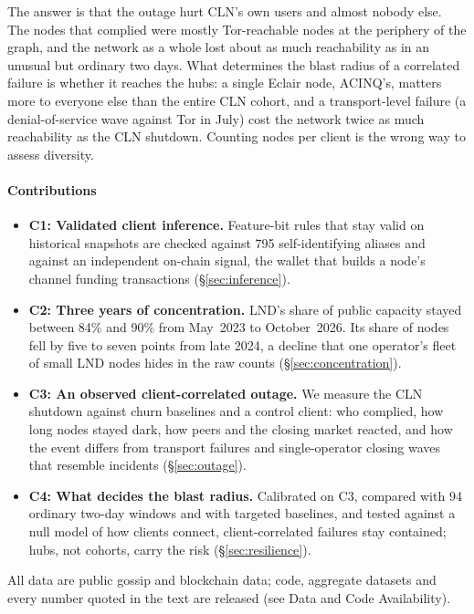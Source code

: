 \documentclass[conference]{IEEEtran}
\begin{document}
The answer is that the outage hurt CLN's own users and almost nobody else. The nodes that complied were mostly
Tor-reachable nodes at the periphery of the graph, and the network as a whole lost about as much
reachability as in an unusual but ordinary two days. What determines the blast radius of a correlated failure is
whether it reaches the hubs: a single Eclair node, ACINQ's, matters more to everyone else than the entire CLN
cohort, and a transport-level failure (a denial-of-service wave against Tor in July) cost the network
twice as much reachability as the CLN shutdown. Counting nodes per client is the wrong way to assess diversity.

\paragraph*{Contributions}
\begin{itemize}
\item \textbf{C1: Validated client inference.} Feature-bit rules that stay valid on historical snapshots are
checked against 795 self-identifying aliases and against an independent on-chain signal, the wallet that builds a
node's channel funding transactions (\S\ref{sec:inference}).
\item \textbf{C2: Three years of concentration.} LND's share of public capacity stayed between 84\% and 90\% from
May~2023 to October~2026. Its share of nodes fell by five to seven points from late 2024, a decline that one
operator's fleet of small LND nodes hides in the raw counts (\S\ref{sec:concentration}).
\item \textbf{C3: An observed client-correlated outage.} We measure the CLN shutdown against churn baselines and a
control client: who complied, how long nodes stayed dark, how peers and the closing market reacted, and how the
event differs from transport failures and single-operator closing waves that resemble incidents
(\S\ref{sec:outage}).
\item \textbf{C4: What decides the blast radius.} Calibrated on C3, compared with 94 ordinary two-day windows and
with targeted baselines, and tested against a null model of how clients connect, client-correlated failures stay
contained; hubs, not cohorts, carry the risk (\S\ref{sec:resilience}).
\end{itemize}
All data are public gossip and blockchain data; code, aggregate datasets and every number quoted in the text are
released (see Data and Code Availability).

\end{document}
